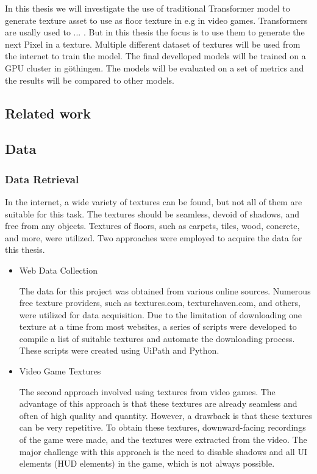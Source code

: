 
In this thesis we will investigate the use of traditional Transformer model to generate texture asset to use as floor texture in e.g in video games. Transformers are usally used to ... . But in this thesis the focus is to use them to generate the next Pixel in a texture. Multiple different dataset of textures will be used from the internet to train the model. The final develloped models will be trained on a GPU cluster in göthingen. The models will be evaluated on a set of metrics and the results will be compared to other models.

\subsection{Related work}
    
\subsection{Data}
    
\subsubsection{Data Retrieval}
In the internet, a wide variety of textures can be found, but not all of them are suitable for this task. The textures should be seamless, devoid of shadows, and free from any objects. Textures of floors, such as carpets, tiles, wood, concrete, and more, were utilized. Two approaches were employed to acquire the data for this thesis.

\begin{itemize}
    \item Web Data Collection

    The data for this project was obtained from various online sources. Numerous free texture providers, such as textures.com, texturehaven.com, and others, were utilized for data acquisition. Due to the limitation of downloading one texture at a time from most websites, a series of scripts were developed to compile a list of suitable textures and automate the downloading process. These scripts were created using UiPath and Python.
    
    \item Video Game Textures
    
    The second approach involved using textures from video games. The advantage of this approach is that these textures are already seamless and often of high quality and quantity. However, a drawback is that these textures can be very repetitive. To obtain these textures, downward-facing recordings of the game were made, and the textures were extracted from the video. The major challenge with this approach is the need to disable shadows and all UI elements (HUD elements) in the game, which is not always possible.
\end{itemize}

